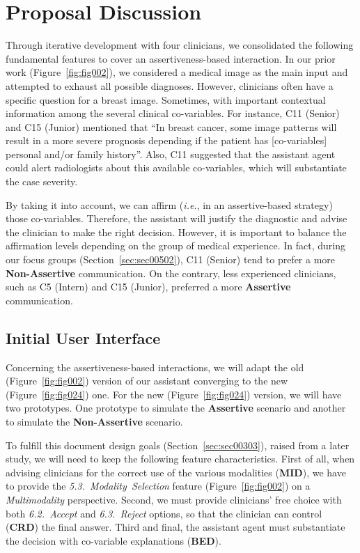 \section{Proposal Discussion}
\label{sec:sec007}

Through iterative development with four clinicians, we consolidated the following fundamental features to cover an assertiveness-based interaction.
In our prior work (Figure~\ref{fig:fig002}), we considered a medical image as the main input and attempted to exhaust all possible diagnoses.
However, clinicians often have a specific question for a breast image.
Sometimes, with important contextual information among the several clinical co-variables.
For instance, C11 (Senior) and C15 (Junior) mentioned that ``In breast cancer, some image patterns will result in a more severe prognosis depending if the patient has [co-variables] personal and/or family history''.
Also, C11 suggested that the assistant agent could alert radiologists about this available co-variables, which will substantiate the case severity.

By taking it into account, we can affirm ({\it i.e.}, in an assertive-based strategy) those co-variables.
Therefore, the assistant will justify the diagnostic and advise the clinician to make the right decision.
However, it is important to balance the affirmation levels depending on the group of medical experience.
In fact, during our focus groups (Section~\ref{sec:sec00502}), C11 (Senior) tend to prefer a more {\bf Non-Assertive} communication.
On the contrary, less experienced clinicians, such as C5 (Intern) and C15 (Junior), preferred a more {\bf Assertive} communication.

\subsection{Initial User Interface}
\label{sec:sec00701}

Concerning the assertiveness-based interactions, we will adapt the old (Figure~\ref{fig:fig002}) version of our assistant converging to the new (Figure~\ref{fig:fig024}) one.
For the new (Figure~\ref{fig:fig024}) version, we will have two prototypes.
One prototype to simulate the {\bf Assertive} scenario and another to simulate the {\bf Non-Assertive} scenario.

To fulfill this document design goals (Section~\ref{sec:sec00303}), raised from a later study, we will need to keep the following feature characteristics.
First of all, when advising clinicians for the correct use of the various modalities ({\bf MID}), we have to provide the {\it 5.3.~Modality~Selection} feature (Figure~\ref{fig:fig002}) on a {\it Multimodality} perspective.
Second, we must provide clinicians' free choice with both {\it 6.2.~Accept} and {\it 6.3.~Reject} options, so that the clinician can control ({\bf CRD}) the final answer.
Third and final, the assistant agent must substantiate the decision with co-variable explanations ({\bf BED}).

